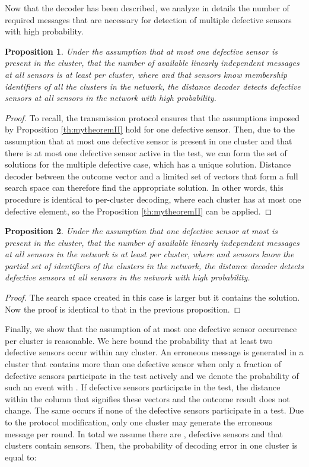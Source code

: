 \documentclass[journal]{IEEEtran}
\newtheorem{prop}{Proposition}
\begin{document}
Now that the decoder has been described, we analyze in details the number of required messages that are necessary for detection of multiple defective sensors with high probability.
\begin{prop}\label{prop:eight}
Under the assumption that at most one defective sensor is present in the cluster, that the number of available linearly independent messages at all sensors is at least  per cluster, where  and that sensors know membership identifiers of all the clusters in the network, the distance decoder detects defective sensors at all sensors in the network with high probability.
\end{prop}
\begin{proof}
To recall, the transmission protocol ensures that the assumptions imposed by Proposition \ref{th:mytheoremII} hold for one defective sensor. Then, due to the assumption that at most one defective sensor is present in one cluster and that there is at most one defective sensor active in the test, we can form the set of solutions for the multiple defective case, which has a unique solution. Distance decoder between the outcome vector and a limited set of vectors that form a full search space can therefore find the appropriate solution. In other words, this procedure is identical to per-cluster decoding, where each cluster has at most one defective element, so the Proposition \ref{th:mytheoremII} can be applied. 
\end{proof}
\begin{prop}\label{prop:nine}
Under the assumption that one defective sensor at most is present in the cluster, that the number of available linearly independent messages at all sensors in the network is at least  per cluster, where  and sensors know the partial set of identifiers of  the clusters in the network, the distance decoder detects defective sensors at all sensors in the network with high probability. 
\end{prop}
\begin{proof}
The search space  created in this case is larger but it contains the solution. Now the proof is identical to that in the previous proposition.
\end{proof}

Finally, we show that the assumption of at most one defective sensor occurrence per cluster is reasonable. We here bound the probability that at least two defective sensors occur within any cluster. An erroneous message is generated in a cluster that contains more than one defective sensor when only a fraction of defective sensors participate in the test actively and we denote the probability of such an event with . If defective sensors participate in the test, the distance within the column that signifies these vectors and the outcome result does not change. The same occurs if none of the defective sensors participate in a test. Due to the protocol modification, only one cluster may generate the erroneous message per round. In total we assume there are ,  defective sensors and that clusters contain  sensors. 
Then, the probability of decoding error in one cluster  is equal to:
\end{document}
